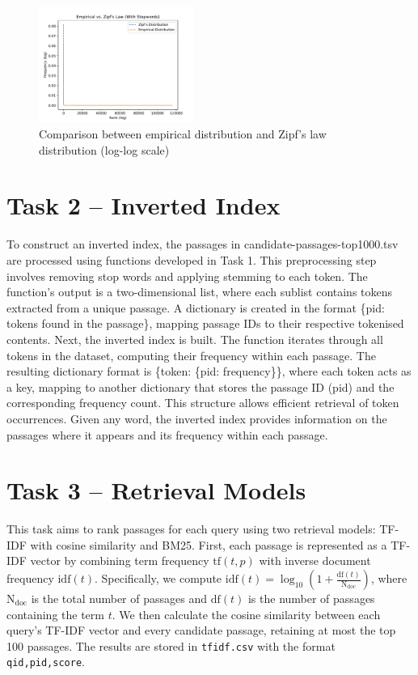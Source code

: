 \documentclass[10pt]{article}
\begin{document}
\subsection*{}
\begin{figure}[ht]
\centering
\includegraphics[width=0.45\textwidth]{Task_1_3_fig.pdf}
\caption{Comparison between empirical distribution
and Zipf’s law distribution (log-log scale)}
\end{figure}

\section{Task 2 -- Inverted Index}
To construct an inverted index, the passages in candidate-passages-top1000.tsv are processed using functions developed in Task 1. This preprocessing step involves removing stop words and applying stemming to each token. The function’s output is a two-dimensional list, where each sublist contains tokens extracted from a unique passage. A dictionary is created in the format \{pid: tokens found in the passage\}, mapping passage IDs to their respective tokenised contents.
Next, the inverted index is built. The function iterates through all tokens in the dataset, computing their frequency within each passage. The resulting dictionary format is \{token: \{pid: frequency\}\}, where each token acts as a key, mapping to another dictionary that stores the passage ID (pid) and the corresponding frequency count.
This structure allows efficient retrieval of token occurrences. Given any word, the inverted index provides information on the passages where it appears and its frequency within each passage.

\section{Task 3 -- Retrieval Models}
This task aims to rank passages for each query using two retrieval models: TF-IDF with cosine similarity and BM25. First, each passage is represented as a TF-IDF vector by combining term frequency \(\mathrm{tf}(t,p)\) with inverse document frequency \(\mathrm{idf}(t)\). Specifically, we compute \(\mathrm{idf}(t) = \log_{10}(1 + \frac{\mathrm{df}(t)}{\mathrm{N_{doc}}})\), where \(\mathrm{N_{doc}}\) is the total number of passages and \(\mathrm{df}(t)\) is the number of passages containing the term \(t\). We then calculate the cosine similarity between each query’s TF-IDF vector and every candidate passage, retaining at most the top 100 passages. The results are stored in \texttt{tfidf.csv} with the format \texttt{qid,pid,score}.
\end{document}
